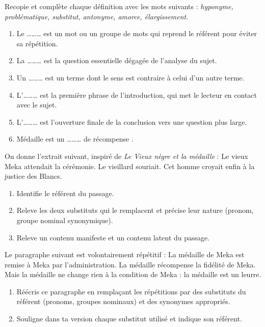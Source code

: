 \documentclass[11pt]{article}
\newcounter{popsec}
\newcounter{popsub}
\newcommand{\courssub}[1]{%
  \stepcounter{popsub}%
  \par\vspace{9pt}\noindent{\popxbold\fontsize{11.5}{13}\selectfont\color{popink}{\color{poporange}\thepopsec.\thepopsub}\hspace{6pt}#1}\par\nopagebreak\vspace{4pt}
}
\begin{document}
\begin{exercice}
Recopie et complète chaque définition avec les mots suivants : \emph{hyponyme, problématique, substitut, antonyme, amorce, élargissement}.
\begin{enumerate}
\item Le \ldots\ldots\ldots{} est un mot ou un groupe de mots qui reprend le référent pour éviter sa répétition.
\item La \ldots\ldots\ldots{} est la question essentielle dégagée de l'analyse du sujet.
\item Un \ldots\ldots\ldots{} est un terme dont le sens est contraire à celui d'un autre terme.
\item L'\ldots\ldots\ldots{} est la première phrase de l'introduction, qui met le lecteur en contact avec le sujet.
\item L'\ldots\ldots\ldots{} est l'ouverture finale de la conclusion vers une question plus large.
\item \og Médaille \fg{} est un \ldots\ldots\ldots{} de \og récompense \fg{}.
\end{enumerate}
\end{exercice}

\begin{exercice}
On donne l'extrait suivant, inspiré de \emph{Le Vieux nègre et la médaille} : \og Le vieux Meka attendait la cérémonie. Le vieillard souriait. Cet homme croyait enfin à la justice des Blancs. \fg{}
\begin{enumerate}
\item Identifie le référent du passage.
\item Releve les deux substituts qui le remplacent et précise leur nature (pronom, groupe nominal synonymique).
\item Releve un contenu manifeste et un contenu latent du passage.
\end{enumerate}
\end{exercice}

\courssub{Je m'entraîne}

\begin{exercice}
Le paragraphe suivant est volontairement répétitif : \og La médaille de Meka est remise à Meka par l'administration. La médaille récompense la fidélité de Meka. Mais la médaille ne change rien à la condition de Meka : la médaille est un leurre. \fg{}
\begin{enumerate}
\item Réécris ce paragraphe en remplaçant les répétitions par des substituts du référent (pronoms, groupes nominaux) et des synonymes appropriés.
\item Souligne dans ta version chaque substitut utilisé et indique son référent.
\end{enumerate}
\end{exercice}
\end{document}
